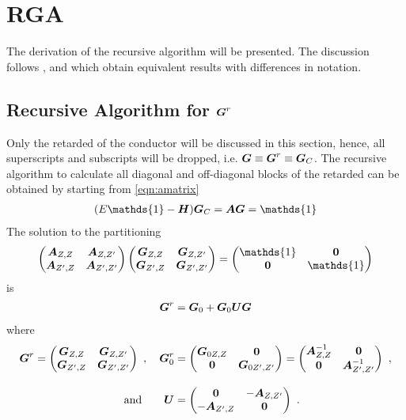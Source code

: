 \chapter{RGA}
\label{app:RGA}
The derivation of the recursive \gfnc{} algorithm will be presented. The discussion follows \cite{JApplPhys.91.2343}, \cite{JApplPhys.81.7845} and \cite{Wimmer2009Thesis} which obtain equivalent results with differences in notation.
\section{Recursive Algorithm for \protect$\boldsymbol{G}^r$}
Only the retarded \gfnc{} of the conductor will be discussed in this section, hence, all superscripts and subscripts will be dropped, i.e. $\boldsymbol{G} \equiv \boldsymbol{G}^r\equiv \boldsymbol{G}_C$. The recursive algorithm to calculate all diagonal and off-diagonal blocks of the retarded \gfnc{} can be obtained by starting from \cref{eqn:amatrix}
\begin{align}
(E\mathds{1}-\mat{H})\mat{G}_C = \mat{A}\mat{G}=\mathds{1}
\label{eqn:amatrixppendix}
\end{align}
The solution to the partitioning
\begin{align}
\begin{pmatrix} \mat{A}_{Z,Z} & \mat{A}_{Z,Z'}\\
		\mat{A}_{Z',Z} & \mat{A}_{Z',Z'}
\end{pmatrix}
\begin{pmatrix} \mat{G}_{Z,Z} & \mat{G}_{Z,Z'}\\
		\mat{G}_{Z',Z} & \mat{G}_{Z',Z'}
\end{pmatrix} = 
\begin{pmatrix} \mathds{1} & \mat{0}\\
		\mat{0} & \mathds{1}
\end{pmatrix}
\end{align}
is
\begin{align}
\boldsymbol{G}^r=\boldsymbol{G}_0+\boldsymbol{G}_0\boldsymbol{U}\boldsymbol{G}
\label{eqn:dysonequationappendix}
\end{align}
where 
\begin{align}
\boldsymbol{G}^r = 
\begin{pmatrix} \boldsymbol{G}_{Z,Z} & \boldsymbol{G}_{Z,Z'}\\
		\boldsymbol{G}_{Z',Z} & \boldsymbol{G}_{Z',Z'}
\end{pmatrix}\ ,\quad
\boldsymbol{G}_0^r &= 
\begin{pmatrix} \boldsymbol{G}_{0 Z,Z} & \boldsymbol{0}\\
		\boldsymbol{0} & \boldsymbol{G}_{0 Z',Z'}
\end{pmatrix}=
\begin{pmatrix} \boldsymbol{A}^{-1}_{Z,Z} & \boldsymbol{0}\\
		\boldsymbol{0} & \boldsymbol{A}^{-1}_{Z',Z'}
\end{pmatrix}\ ,\notag\\[3mm] 
\text{and}\hspace{2em}
\boldsymbol{U} &= 
\begin{pmatrix} \boldsymbol{0} & -\boldsymbol{A}_{Z,Z'}\\
		-\boldsymbol{A}_{Z',Z} & \boldsymbol{0}
\end{pmatrix}\ .
\end{align}
